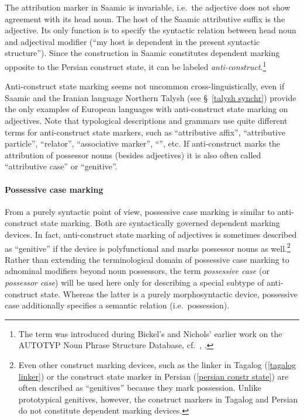 The attribution marker in Saamic is invariable, i.e.~the adjective does not show agreement with its head noun. The host of the Saamic attributive suffix is the adjective. Its only function is to specify the syntactic relation between head noun and adjectival modifier (“my host is dependent in the present syntactic structure”). Since the construction in Saamic constitutes dependent marking opposite to the Persian construct state, it can be labeled \emph{anti\hyp{}construct}.\footnote{The term was introduced during Bickel's and Nichols' earlier work on the AUTOTYP Noun Phrase Structure Database, cf.~\citet[2, elsewhere]{bickel-etal2002}, \citet{AUTOTYP-NP}.} 

Anti\hyp{}construct state marking seems not uncommon cross-linguistically, even if Saamic and the Iranian language Northern Talysh (see \S~\ref{talysh synchr}) provide the only examples of European languages with anti\hyp{}construct state marking on adjectives. Note that typological descriptions and grammars use quite different terms for anti\hyp{}construct state markers, such as “attributive affix”, “attributive particle”, “relator”, “associative marker”, “”, etc. If anti\hyp{}construct marks the attribution of possessor nouns (besides adjectives) it is also often called “attributive case” or “genitive”.

\paragraph{Possessive case marking} 
From a purely syntactic point of view, possessive case marking is similar to anti\hyp{}construct state marking. Both are syntactically governed dependent marking devices. In fact, anti\hyp{}construct state marking of adjectives is sometimes described as “genitive” if the device is polyfunctional and marks possessor nouns as well.\footnote{Even other construct marking devices, such as the linker in Tagalog (\ref{tagalog linker}) or the construct state marker in Persian (\ref{persian constr state}) are often described as “genitives” because they mark possession. Unlike prototypical genitives, however, the construct markers in Tagalog and Persian do not constitute dependent marking devices.} Rather than extending the terminological domain of possessive case marking to adnominal modifiers beyond noun possessors, the term \emph{possessive case} (or \emph{possessor case}) will be used here only for describing a special subtype of anti\hyp{}construct state. Whereas the latter is a purely morphosyntactic device, possessive case additionally specifies a semantic relation (i.e.~possession).

